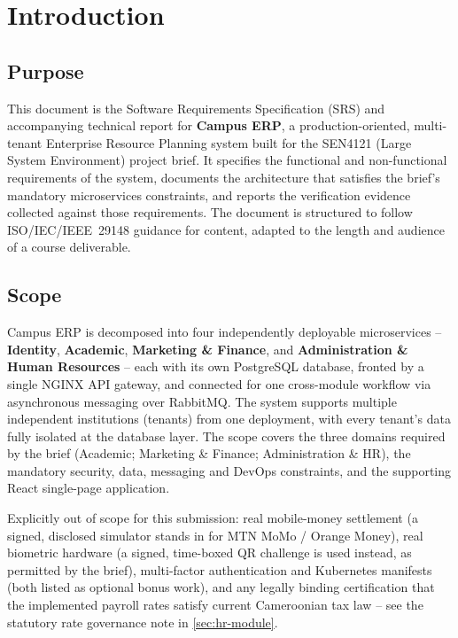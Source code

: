 \section{Introduction}
\label{sec:introduction}

\subsection{Purpose}
This document is the Software Requirements Specification (SRS) and accompanying
technical report for \textbf{Campus ERP}, a production-oriented, multi-tenant
Enterprise Resource Planning system built for the SEN4121 (Large System
Environment) project brief. It specifies the functional and non-functional
requirements of the system, documents the architecture that satisfies the
brief's mandatory microservices constraints, and reports the verification
evidence collected against those requirements. The document is structured to
follow ISO/IEC/IEEE~29148 guidance for content, adapted to the length and
audience of a course deliverable.

\subsection{Scope}
Campus ERP is decomposed into four independently deployable microservices --
\textbf{Identity}, \textbf{Academic}, \textbf{Marketing \& Finance}, and
\textbf{Administration \& Human Resources} -- each with its own PostgreSQL
database, fronted by a single NGINX API gateway, and connected for one
cross-module workflow via asynchronous messaging over RabbitMQ. The system
supports multiple independent institutions (tenants) from one deployment,
with every tenant's data fully isolated at the database layer. The scope
covers the three domains required by the brief (Academic; Marketing \&
Finance; Administration \& HR), the mandatory security, data, messaging and
DevOps constraints, and the supporting React single-page application.

Explicitly out of scope for this submission: real mobile-money settlement
(a signed, disclosed simulator stands in for MTN MoMo / Orange Money),
real biometric hardware (a signed, time-boxed QR challenge is used instead,
as permitted by the brief), multi-factor authentication and Kubernetes
manifests (both listed as optional bonus work), and any legally binding
certification that the implemented payroll rates satisfy current
Cameroonian tax law -- see the statutory rate governance note in
\cref{sec:hr-module}.

